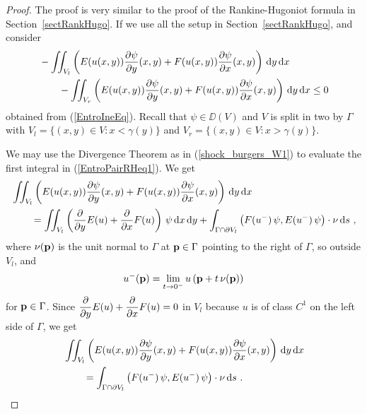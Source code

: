 
\begin{proof}
The proof is very similar to the proof of the Rankine-Hugoniot formula
in Section~\ref{sectRankHugo}.  If we use all the setup in
Section~\ref{sectRankHugo}, and consider
\begin{equation} \label{EntroPairRHeq1}
\begin{split}
&-\iint_{V_l} \left( E(u(x,y)) \pdydx{\psi}{y}(x,y) +
  F(u(x,y)) \pdydx{\psi}{x}(x,y) \right) \dx{y}\dx{x} \\
&\qquad -\iint_{V_r} \left( E(u(x,y)) \pdydx{\psi}{y}(x,y) +
  F(u(x,y)) \pdydx{\psi}{x}(x,y) \right) \dx{y}\dx{x} \leq 0
\end{split}
\end{equation}
obtained from (\ref{EntroIneEq}).
Recall that $\psi \in \DD(V)$ and $V$ is split in two by $\Gamma$ with
$V_l = \{ (x,y) \in V : x < \gamma(y)\}$ and
$V_r = \{ (x,y) \in V : x > \gamma(y)\}$.

We may use the Divergence Theorem as in (\ref{shock_burgers_W1}) to
evaluate the first integral in (\ref{EntroPairRHeq1}).  We get
\begin{align*}
&\iint_{V_l}
\left( E(u(x,y)) \pdydx{\psi}{y}(x,y) +
F(u(x,y)) \pdydx{\psi}{x}(x,y) \right) \dx{y}\dx{x} \\
&\qquad = \iint_{V_l}
\left( \pdfdx{E(u)}{y} + \pdfdx{F(u)}{x} \right)\,\psi
\dx{x}\dx{y}
+ \int_{\Gamma \cap \partial V_l} \left(F(u^-)\,\psi, E(u^-)\,\psi \right)\cdot
\VEC{\nu} \dx{s} \ ,
\end{align*}
where $\displaystyle \VEC{\nu}(\VEC{p})$ is the unit normal to $\Gamma$
at $\VEC{p} \in \Gamma$ pointing to the right of $\Gamma$, so outside
$V_l$, and
\[
u^-(\VEC{p}) = \lim_{t\rightarrow 0^-}
u\left(\VEC{p}+t\, \VEC{\nu}(\VEC{p})\right)
\]
for $\VEC{p} \in \Gamma$.
Since $\displaystyle \pdfdx{E(u)}{y} + \pdfdx{F(u)}{x} = 0$ in
$V_l$ because $u$ is of class $C^1$ on the left side of $\Gamma$, we get
\begin{equation} \label{EntroPairRHeq2}
\begin{split}
& \iint_{V_l} \left( E(u(x,y)) \pdydx{\psi}{y}(x,y) +
F(u(x,y)) \pdydx{\psi}{x}(x,y) \right) \dx{y}\dx{x} \\
&\qquad = \int_{\Gamma \cap \partial V_l}
\left(F(u^-)\,\psi, E(u^-)\,\psi \right)\cdot \VEC{\nu} \dx{s} \ .
\end{split}
\end{equation}


\end{proof}

